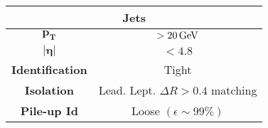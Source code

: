 \begin{table}[H]
    \centering

    \begin{tabular}{c|c}
        \toprule
        \multicolumn{2}{c}{\textbf{Jets}}\\
        \midrule
        \midrule
        
        $\mathbf{p_T}$& $>20 {\,\text{Ge\hspace{-.08em}V}}$\\
        \midrule
        $\bm{|\eta|}$& $<4.8$ \\
        \midrule
        \textbf{Identification} & Tight\\
        \midrule
        \textbf{Isolation} & Lead. Lept. $\Delta R>0.4$ matching\\
        \midrule
        \textbf{Pile-up Id} & Loose  $(\epsilon\sim99\%)$ \\
        \bottomrule
    \end{tabular}
\end{table}      


